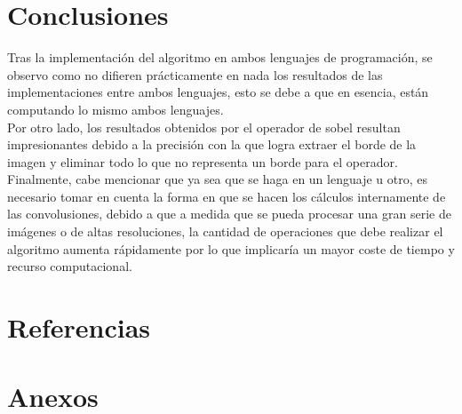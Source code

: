 \documentclass[11pt, letterpaper]{article}
\begin{document}
\newpage
	
\section{Conclusiones}
	
Tras la implementación del algoritmo en ambos lenguajes de programación, se observo como no difieren prácticamente en nada los resultados de las implementaciones entre ambos lenguajes, esto se debe a que en esencia, están computando lo mismo ambos lenguajes. \\

Por otro lado, los resultados obtenidos por el operador de sobel resultan impresionantes debido a la precisión con la que logra extraer el borde de la imagen y eliminar todo lo que no representa un borde para el operador. \\

Finalmente, cabe mencionar que ya sea que se haga en un lenguaje u otro, es necesario tomar en cuenta la forma en que se hacen los cálculos internamente de las convolusiones, debido a que a medida que se pueda procesar una gran serie de imágenes o de altas resoluciones, la cantidad de operaciones que debe realizar el algoritmo aumenta rápidamente por lo que implicaría un mayor coste de tiempo y recurso computacional.

\newpage

	
\section{Referencias}  %

\newpage
	
\section{Anexos}	
\end{document}
